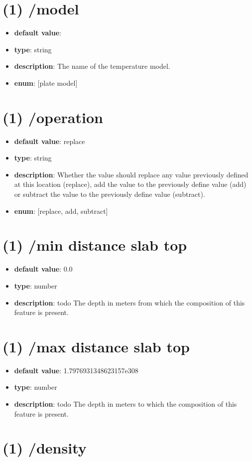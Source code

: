 \section{(1) /model}
\begin{itemize}[leftmargin=1em]\item {\bf default value}: 
\item {\bf type}: string
\item {\bf description}: The name of the temperature model.
\item {\bf enum}: [plate model]\end{itemize}\section{(1) /operation}
\begin{itemize}[leftmargin=1em]\item {\bf default value}: replace
\item {\bf type}: string
\item {\bf description}: Whether the value should replace any value previously defined at this location (replace), add the value to the previously define value (add) or subtract the value to the previously define value (subtract).
\item {\bf enum}: [replace, add, subtract]\end{itemize}\section{(1) /min distance slab top}
\begin{itemize}[leftmargin=1em]\item {\bf default value}: 0.0
\item {\bf type}: number
\item {\bf description}: todo The depth in meters from which the composition of this feature is present.
\end{itemize}\section{(1) /max distance slab top}
\begin{itemize}[leftmargin=1em]\item {\bf default value}: 1.7976931348623157e308
\item {\bf type}: number
\item {\bf description}: todo The depth in meters to which the composition of this feature is present.
\end{itemize}\section{(1) /density}

